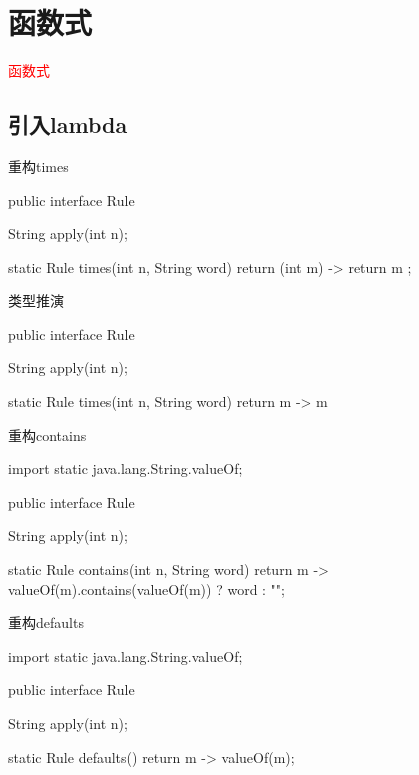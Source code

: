 \section{函数式}
\label{sec:oo}

\begin{frame}
  \begin{center}
    \Huge{\textcolor{red}{函数式}}
  \end{center}
\end{frame}

\subsection{引入lambda}

\begin{frame}[fragile]{重构times}
  \begin{java}
public interface Rule {
  String apply(int n);

  static Rule times(int n, String word) {
    return (int m) -> {
      return m %
    };
  }
}
  \end{java}
\end{frame}

\begin{frame}[fragile]{类型推演}
  \begin{java}
public interface Rule {
  String apply(int n);

  static Rule times(int n, String word) {
    return m -> m %
  }
}
  \end{java}
\end{frame}

\begin{frame}[fragile]{重构contains}
  \begin{java}
import static java.lang.String.valueOf;

public interface Rule {
  String apply(int n);

  static Rule contains(int n, String word) {
    return m -> valueOf(m).contains(valueOf(m)) ? word : "";
  }
}
  \end{java}
\end{frame}


\begin{frame}[fragile]{重构defaults}
  \begin{java}
import static java.lang.String.valueOf;

public interface Rule {
  String apply(int n);

  static Rule defaults() {
    return m -> valueOf(m);
  }  
}
  \end{java}
\end{frame}

